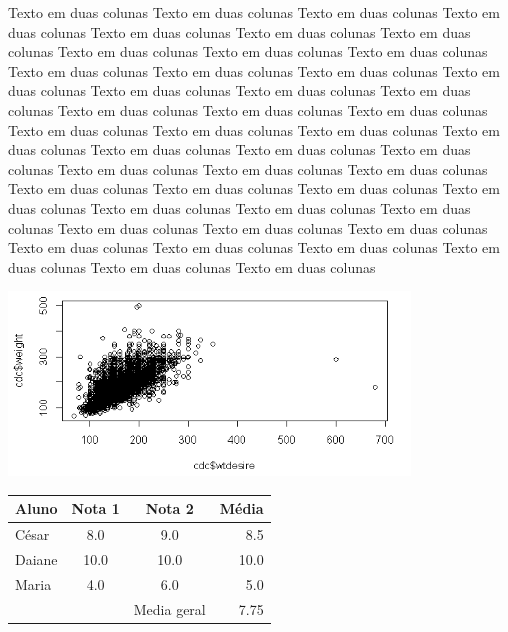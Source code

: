 \documentclass[12pt,a4paper]{article}
\begin{document}
\begin{multicols}{2} %
Texto em duas colunas Texto em duas colunas Texto em duas colunas Texto em duas colunas Texto em duas colunas Texto em duas colunas Texto em duas colunas Texto em duas colunas Texto em duas colunas Texto em duas colunas Texto em duas colunas Texto em duas colunas Texto em duas colunas Texto em duas colunas Texto em duas colunas Texto em duas colunas Texto em duas colunas Texto em duas colunas Texto em duas colunas Texto em duas colunas Texto em duas colunas Texto em duas colunas Texto em duas colunas Texto em duas colunas Texto em duas colunas Texto em duas colunas Texto em duas colunas Texto em duas colunas Texto em duas colunas Texto em duas colunas Texto em duas colunas Texto em duas colunas Texto em duas colunas Texto em duas colunas Texto em duas colunas Texto em duas colunas Texto em duas colunas Texto em duas colunas Texto em duas colunas Texto em duas colunas Texto em duas colunas Texto em duas colunas Texto em duas colunas Texto em duas colunas Texto em duas colunas Texto em duas colunas 
\end{multicols}

\includegraphics[width=0.8\textwidth]{figuras/q1.PNG} %

\begin{center}
\begin{tabular}{l|c|c|r} 




\hline
Aluno & Nota 1 & Nota 2 & Média \\ \hline
César & 8.0 & 9.0 & 8.5 \\ 
Daiane & 10.0 & 10.0 & 10.0 \\
Maria & 4.0 & 6.0 & 5.0 \\ \hline
& & Media geral & 7.75 \\ \hline

\end{tabular}
\end{center}
\end{document}
